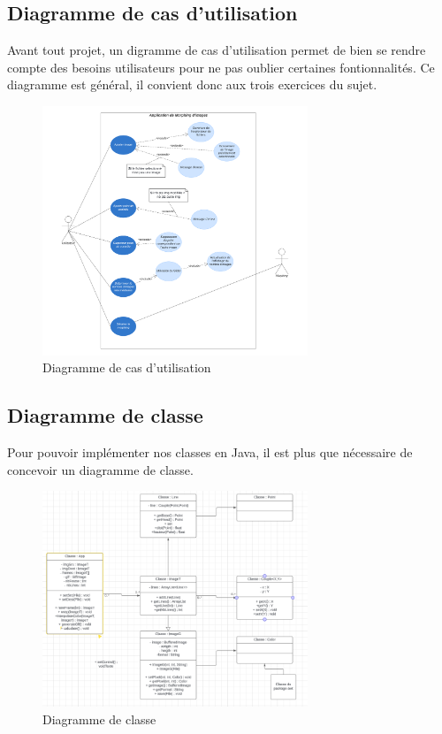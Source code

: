 \documentclass[11pt, titlepage]{article}
\begin{document}
\subsection{Diagramme de cas d'utilisation}


Avant tout projet, un digramme de cas d'utilisation permet de bien se rendre compte des besoins utilisateurs pour ne pas oublier certaines fontionnalités. Ce diagramme est général, il convient donc aux trois exercices du sujet.

\begin{figure}[h]
	\centering
	\includegraphics[width=300px]{img/diagramme-utilisation.png}
	\caption{Diagramme de cas d'utilisation}
\end{figure}


\subsection{Diagramme de classe}

Pour pouvoir implémenter nos classes en Java, il est plus que nécessaire de concevoir un diagramme de classe.

\begin{figure}[h]
	\centering
	\includegraphics[width=300px]{img/diagramme-classes.png}
	\caption{Diagramme de classe}
\end{figure}
\end{document}

